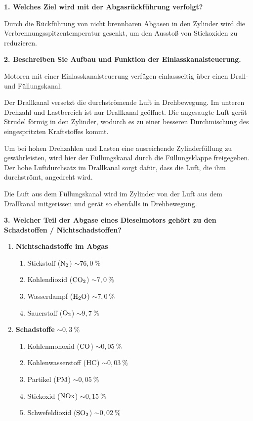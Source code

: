 \textbf{1. Welches Ziel wird mit der Abgasrückführung verfolgt?}

Durch die Rückführung von nicht brennbaren Abgasen in den Zylinder wird
die Verbrennungsspitzentemperatur gesenkt, um den Ausstoß von
Stickoxiden zu reduzieren.

\textbf{2. Beschreiben Sie Aufbau und Funktion der
Einlasskanalsteuerung.}

Motoren mit einer Einlasskanalsteuerung verfügen einlassseitig über
einen Drall- und Füllungskanal.

Der Drallkanal versetzt die durchströmende Luft in Drehbewegung. Im
unteren Drehzahl und Lastbereich ist nur Drallkanal geöffnet. Die
angesaugte Luft gerät Strudel förmig in den Zylinder, wodurch es zu
einer besseren Durchmischung des eingespritzten Kraftstoffes kommt.

Um bei hohen Drehzahlen und Lasten eine ausreichende Zylinderfüllung zu
gewährleisten, wird hier der Füllungskanal durch die Füllungsklappe
freigegeben. Der hohe Luftdurchsatz im Drallkanal sorgt dafür, dass die
Luft, die ihm durchströmt, angedreht wird.

Die Luft aus dem Füllungskanal wird im Zylinder von der Luft aus dem
Drallkanal mitgerissen und gerät so ebenfalls in Drehbewegung.

\textbf{3. Welcher Teil der Abgase eines Dieselmotors gehört zu den
Schadstoffen / Nichtschadstoffen?}

\begin{enumerate}
\item
  \textbf{Nichtschadstoffe im Abgas}

  \begin{enumerate}
  \def\labelenumii{\arabic{enumii}.}
  \item
    Stickstoff ($\ce{N2}$) $\sim 76,0~\%$
  \item
    Kohlendioxid ($\ce{CO2}$) $\sim 7,0~\%$
  \item
    Wasserdampf ($\ce{H2O}$) $\sim 7,0~\%$
  \item
    Sauerstoff ($\ce{O2}$) $\sim 9,7~\%$
  \end{enumerate}
\item
  \textbf{Schadstoffe} $\sim 0,3~\%$

  \begin{enumerate}
  \def\labelenumii{\arabic{enumii}.}
  \item
    Kohlenmonoxid ($\ce{CO}$) $\sim 0,05~\%$
  \item
    Kohlenwasserstoff ($\ce{HC}$) $\sim 0,03~\%$
  \item
    Partikel ($\ce{PM}$) $\sim 0,05~\%$
  \item
    Stickoxid ($\ce{NOx}$) $\sim 0,15~\%$
  \item
    Schwefeldioxid ($\ce{SO2}$) $\sim 0,02~\%$
  \end{enumerate}
\end{enumerate}

